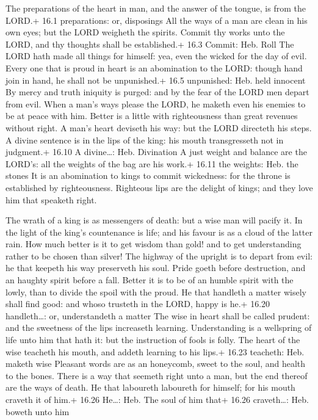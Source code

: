  The preparations of the heart in man, and the answer of the
tongue, is from the LORD.+ 16.1 preparations: or, disposings
 All the ways of a man are clean in his own eyes; but the
LORD weigheth the spirits.  Commit thy works unto the LORD,
and thy thoughts shall be established.+ 16.3 Commit: Heb. Roll
 The LORD hath made all things for himself: yea, even the
wicked for the day of evil.  Every one that is proud in
heart is an abomination to the LORD: though hand join in hand, he shall
not be unpunished.+ 16.5 unpunished: Heb. held innocent  By
mercy and truth iniquity is purged: and by the fear of the LORD men
depart from evil.  When a man's ways please the LORD, he
maketh even his enemies to be at peace with him.  Better is
a little with righteousness than great revenues without right.
 A man's heart deviseth his way: but the LORD directeth his
steps.  A divine sentence is in the lips of the king: his
mouth transgresseth not in judgment.+ 16.10 A divine\ldots: Heb.
Divination  A just weight and balance are the LORD's: all
the weights of the bag are his work.+ 16.11 the weights: Heb. the stones
 It is an abomination to kings to commit wickedness: for
the throne is established by righteousness.  Righteous lips
are the delight of kings; and they love him that speaketh right.

 The wrath of a king is as messengers of death: but a wise
man will pacify it.  In the light of the king's countenance
is life; and his favour is as a cloud of the latter rain. 
How much better is it to get wisdom than gold! and to get understanding
rather to be chosen than silver!  The highway of the
upright is to depart from evil: he that keepeth his way preserveth his
soul.  Pride goeth before destruction, and an haughty
spirit before a fall.  Better it is to be of an humble
spirit with the lowly, than to divide the spoil with the proud.
 He that handleth a matter wisely shall find good: and
whoso trusteth in the LORD, happy is he.+ 16.20 handleth\ldots: or,
understandeth a matter  The wise in heart shall be called
prudent: and the sweetness of the lips increaseth learning.
 Understanding is a wellspring of life unto him that hath
it: but the instruction of fools is folly.  The heart of
the wise teacheth his mouth, and addeth learning to his lips.+ 16.23
teacheth: Heb. maketh wise  Pleasant words are as an
honeycomb, sweet to the soul, and health to the bones. 
There is a way that seemeth right unto a man, but the end thereof are
the ways of death.  He that laboureth laboureth for
himself; for his mouth craveth it of him.+ 16.26 He\ldots: Heb. The soul
of him that+ 16.26 craveth\ldots: Heb. boweth unto him

